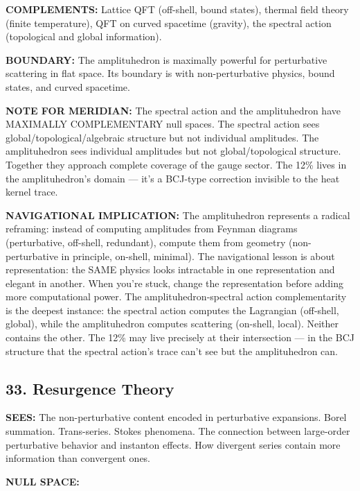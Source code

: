 \textbf{COMPLEMENTS:} Lattice QFT (off-shell, bound states), thermal field theory (finite temperature), QFT on curved spacetime (gravity), the spectral action (topological and global information).


\textbf{BOUNDARY:} The amplituhedron is maximally powerful for perturbative scattering in flat space. Its boundary is with non-perturbative physics, bound states, and curved spacetime.


\textbf{NOTE FOR MERIDIAN:} The spectral action and the amplituhedron have MAXIMALLY COMPLEMENTARY null spaces. The spectral action sees global/\allowbreak topological/\allowbreak algebraic structure but not individual amplitudes. The amplituhedron sees individual amplitudes but not global/\allowbreak topological structure. Together they approach complete coverage of the gauge sector. The 12\% lives in the amplituhedron's domain — it's a BCJ-type correction invisible to the heat kernel trace.


\textbf{NAVIGATIONAL IMPLICATION:} The amplituhedron represents a radical reframing: instead of computing amplitudes from Feynman diagrams (perturbative, off-shell, redundant), compute them from geometry (non-perturbative in principle, on-shell, minimal). The navigational lesson is about representation: the SAME physics looks intractable in one representation and elegant in another. When you're stuck, change the representation before adding more computational power. The amplituhedron-spectral action complementarity is the deepest instance: the spectral action computes the Lagrangian (off-shell, global), while the amplituhedron computes scattering (on-shell, local). Neither contains the other. The 12\% may live precisely at their intersection — in the BCJ structure that the spectral action's trace can't see but the amplituhedron can.


\bigskip\noindent\makebox[\textwidth]{\color{rulegray}\rule{5cm}{0.3pt}}\bigskip


\subsection*{33. Resurgence Theory}


\textbf{SEES:} The non-perturbative content encoded in perturbative expansions. Borel summation. Trans-series. Stokes phenomena. The connection between large-order perturbative behavior and instanton effects. How divergent series contain more information than convergent ones.


\textbf{NULL SPACE:}

